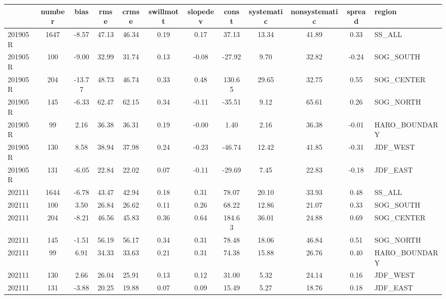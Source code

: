 \begin{tabular}{lccccccccccl}
\toprule
 & number & bias & rmse & crmse & swillmott & slopedev & const & systematic & nonsystematic & spread & region \\
\midrule
201905R & 1647 & -8.57 & 47.13 & 46.34 & 0.19 & 0.17 & 37.13 & 13.34 & 41.89 & 0.33 & SS_ALL \\
201905R & 100 & -9.00 & 32.99 & 31.74 & 0.13 & -0.08 & -27.92 & 9.70 & 32.82 & -0.24 & SOG_SOUTH \\
201905R & 204 & -13.77 & 48.73 & 46.74 & 0.33 & 0.48 & 130.65 & 29.65 & 32.75 & 0.55 & SOG_CENTER \\
201905R & 145 & -6.33 & 62.47 & 62.15 & 0.34 & -0.11 & -35.51 & 9.12 & 65.61 & 0.26 & SOG_NORTH \\
201905R & 99 & 2.16 & 36.38 & 36.31 & 0.19 & -0.00 & 1.40 & 2.16 & 36.38 & -0.01 & HARO_BOUNDARY \\
201905R & 130 & 8.58 & 38.94 & 37.98 & 0.24 & -0.23 & -46.74 & 12.42 & 41.85 & -0.31 & JDF_WEST \\
201905R & 131 & -6.05 & 22.84 & 22.02 & 0.07 & -0.11 & -29.69 & 7.45 & 22.83 & -0.18 & JDF_EAST \\
202111 & 1644 & -6.78 & 43.47 & 42.94 & 0.18 & 0.31 & 78.07 & 20.10 & 33.93 & 0.48 & SS_ALL \\
202111 & 100 & 3.50 & 26.84 & 26.62 & 0.11 & 0.26 & 68.22 & 12.86 & 21.07 & 0.33 & SOG_SOUTH \\
202111 & 204 & -8.21 & 46.56 & 45.83 & 0.36 & 0.64 & 184.63 & 36.01 & 24.88 & 0.69 & SOG_CENTER \\
202111 & 145 & -1.51 & 56.19 & 56.17 & 0.34 & 0.31 & 78.48 & 18.06 & 46.84 & 0.51 & SOG_NORTH \\
202111 & 99 & 6.91 & 34.33 & 33.63 & 0.21 & 0.31 & 74.38 & 15.88 & 26.76 & 0.40 & HARO_BOUNDARY \\
202111 & 130 & 2.66 & 26.04 & 25.91 & 0.13 & 0.12 & 31.00 & 5.32 & 24.14 & 0.16 & JDF_WEST \\
202111 & 131 & -3.88 & 20.25 & 19.88 & 0.07 & 0.09 & 15.49 & 5.27 & 18.76 & 0.18 & JDF_EAST \\
\bottomrule
\end{tabular}
